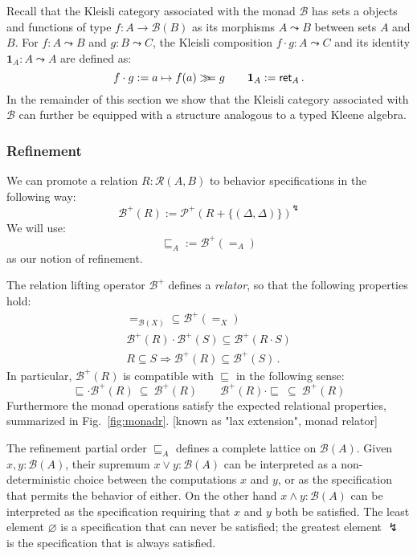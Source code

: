 Recall that the Kleisli category associated with the monad $\mathcal{B}$
has sets a objects and
functions of type $f : A \rightarrow \mathcal{B}(B)$
as its morphisms $A \leadsto B$ between sets $A$ and $B$.
For $f : A \leadsto B$ and $g : B \leadsto C$,
the Kleisli composition $f \cdot g : A \leadsto C$
and its identity $\mathbf{1}_A : A \leadsto A$ are defined as:
\[
    f \cdot g := a \mapsto f(a) \gg\!\!= g \qquad \mathbf{1}_A :=  \mathsf{ret} _A \,.
\]
In the remainder of this section we show that
the Kleisli category associated with $\mathcal{B}$
can further be equipped with a structure analogous
to a typed Kleene algebra.

\subsubsection{Refinement}

We can promote a relation $R : \mathcal{R}(A, B)$
to behavior specifications in the following way:
\[ \mathcal{B}^+(R) :=
   \mathcal{P}^+(R + \{ (\Delta, \Delta) \})^\lightning \]
We will use:
\[ {\sqsubseteq}_A := \mathcal{B}^+(=_A) \]
as our notion of refinement.

The relation lifting operator $\mathcal{B}^+$ defines a \emph{relator},
so that the following properties hold:
\begin{gather*}
  {=}_{\mathcal{B}(X)} \subseteq \mathcal{B}^+(=_X) \\
  \mathcal{B}^+(R) \cdot \mathcal{B}^+(S) \subseteq
    \mathcal{B}^+(R \cdot S) \\
  R \subseteq S \Rightarrow
    \mathcal{B}^+(R) \subseteq \mathcal{B}^+(S) \,.
\end{gather*}
In particular, $\mathcal{B}^+(R)$ is compatible with $\sqsubseteq$
in the following sense:
\[
    {\sqsubseteq} \cdot \mathcal{B}^+(R) \:\subseteq\: \mathcal{B}^+(R) \qquad
    \mathcal{B}^+(R) \cdot {\sqsubseteq} \:\subseteq\: \mathcal{B}^+(R)
\]
Furthermore the monad operations satisfy the expected relational properties,
summarized in Fig.~\ref{fig:monadr}.
[known as "lax extension", monad relator]

The refinement partial order $\sqsubseteq_A$
defines a complete lattice on $\mathcal{B}(A)$.
Given $x, y : \mathcal{B}(A)$,
their supremum $x \vee y : \mathcal{B}(A)$
can be interpreted as a non-deterministic choice
between the computations $x$ and $y$,
or as the specification that permits the behavior of either.
On the other hand $x \wedge y : \mathcal{B}(A)$ can be interpreted as
the specification requiring that $x$ and $y$ both be satisfied.
The least element $\varnothing$
is a specification that can never be satisfied;
the greatest element $\lightning$
is the specification that is always satisfied.

